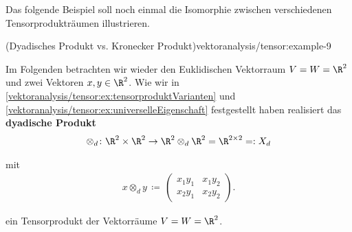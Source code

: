 \documentclass[letterpaper,10pt,english]{jupyterBook}
\begin{document}
\par
Das folgende Beispiel soll noch einmal die Isomorphie zwischen verschiedenen Tensorprodukträumen illustrieren.
\begin{example}{(Dyadisches Produkt vs. Kronecker Produkt)}{vektoranalysis/tensor:example-9}



\par
Im Folgenden betrachten wir wieder den Euklidischen Vektorraum \(V=W=\R^2\) und zwei Vektoren \(x, y \in \R^2\).
Wie wir in \cref{vektoranalysis/tensor:ex:tensorproduktVarianten} und \cref{vektoranalysis/tensor:ex:universelleEigenschaft} festgestellt haben realisiert das \textbf{dyadische Produkt}
\begin{align*}
\otimes_d \colon \R^2 \times \R^2 \rightarrow \R^2 \otimes_d \R^2 = \R^{2 \times 2} =: X_d
\end{align*}
\par
mit
\begin{align*}
x \otimes_d y \, \coloneqq \,
\begin{pmatrix}
x_1y_1 & x_1y_2 \\
x_2y_1 & x_2y_2
\end{pmatrix}.
\end{align*}
\par
ein Tensorprodukt der Vektorräume \(V=W=\R^2\).


\end{example}
\end{document}
